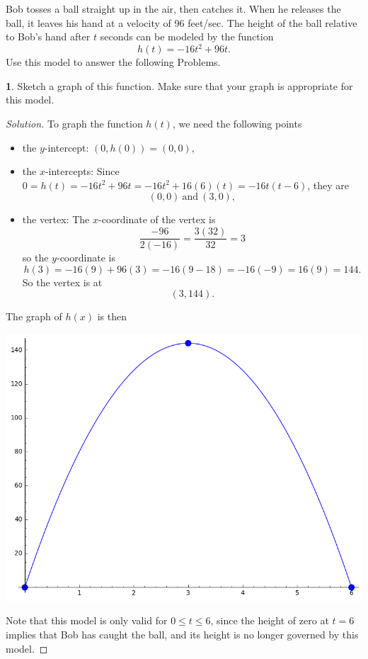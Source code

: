 \documentclass[12pt]{amsart}
\theoremstyle{definition}
\newtheorem{thm}{}
\begin{document}
\newpage
Bob tosses a ball straight up in the air, then catches it.
When he releases the ball, it leaves his hand at a velocity of 96 feet/sec.
The height of the ball relative to Bob's hand after $t$ seconds can be modeled by the function
$$h(t) = -16t^2 + 96t.$$
Use this model to answer the following Problems.
\begin{thm}\label{problem: kinematics graph}
  Sketch a graph of this function.
  Make sure that your graph is appropriate for this model.
\end{thm}
\begin{proof}[Solution]
  To graph the function $h(t)$, we need the following points
  \begin{itemize}
  \item
    the $y$-intercept: $(0,h(0)) = (0,0)$,
  \item
    the $x$-intercepts:
    Since $0 = h(t) = -16t^2 +96t = -16t^2 + 16(6)(t)= -16t(t - 6)$, they are
    $$(0,0)\ \text{and}\ (3,0),$$
  \item
    the vertex:
    The $x$-coordinate of the vertex is
    $$\frac{-96}{2(-16)} = \frac{3(32)}{32} = 3$$
    so the $y$-coordinate is
    $$h(3) = -16(9) + 96(3) = -16(9 - 18) = -16(-9) = 16(9) = 144.$$
    So the vertex is at
    $$(3,144).$$
  \end{itemize}
  The graph of $h(x)$ is then
  \begin{center}
    \includegraphics[scale=0.5]{kinematics}
  \end{center}
  Note that this model is only valid for $0 \leq t \leq 6$, since the height of zero at $t = 6$ implies that Bob has caught the ball, and its height is no longer governed by this model.
\end{proof}
\newpage
\end{document}
